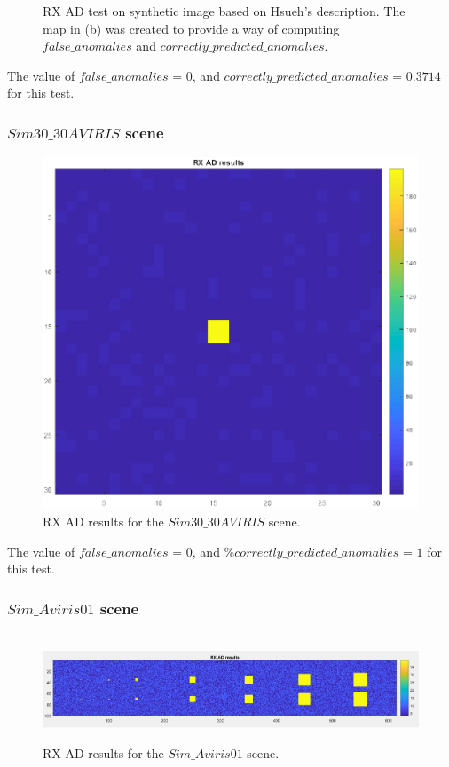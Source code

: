 \begin{figure}[H]
\caption{RX AD test on synthetic image based on Hsueh's description. The map in (b) was created to provide a way of computing $false\_anomalies$ and $ correctly\_predicted\_anomalies$.  }
\label{fig:hsueh_image_RX_test}
\end{figure}

The value of $false\_anomalies$ = 0, and  $correctly\_predicted\_anomalies$ = $0.3714$ for this test.

\subsubsection{$Sim30\_30AVIRIS$ scene }
\begin{figure}[H]
\centering
   \includegraphics[scale=0.4]{images/AD_testing/synthetic_images/rx_ad_30_30.png}
  \caption{ RX AD results for the $Sim30\_30AVIRIS$ scene.} 
  \label{fig:rx_sim_aviris_30_30}
\end{figure}

The value of $false\_anomalies$ = 0, and  $\%correctly\_predicted\_anomalies$ = $1$ for this test.


\subsubsection{$Sim\_Aviris01$ scene }
\begin{figure}[H]
\hbox{\hspace*{-1cm}                                              
   \includegraphics[scale=0.4]{images/AD_testing/synthetic_images/rx_ad_614_100.png}}
  \caption{ RX AD results for the $Sim\_Aviris01$ scene.} 
  \label{fig:rx_sim_aviris_01}
\end{figure}


